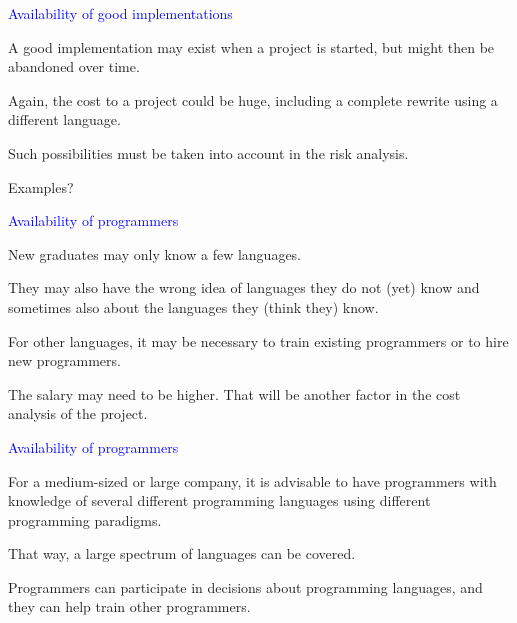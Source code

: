 \documentclass{slides}
\newcommand{\ti}[1]{\begin{center}\Large{\textcolor{blue}{#1}}\end{center}}
\begin{document}
\begin{slide}\ti{Availability of good implementations}

A good implementation may exist when a project is started, but might
then be abandoned over time.

Again, the cost to a project could be huge, including a complete
rewrite using a different language.

Such possibilities must be taken into account in the risk analysis.

Examples?

\vfill\end{slide}
\begin{slide}\ti{Availability of programmers}

New graduates may only know a few languages.

They may also have the wrong idea of languages they do not (yet) know
and sometimes also about the languages they (think they) know.

For other languages, it may be necessary to train existing programmers
or to hire new programmers.

The salary may need to be higher.  That will be another factor in the
cost analysis of the project.

\vfill\end{slide}
\begin{slide}\ti{Availability of programmers}

For a medium-sized or large company, it is advisable to have
programmers with knowledge of several different programming languages
using different programming paradigms.

That way, a large spectrum of languages can be covered.

Programmers can participate in decisions about programming languages,
and they can help train other programmers.

\vfill\end{slide}



\end{document}
